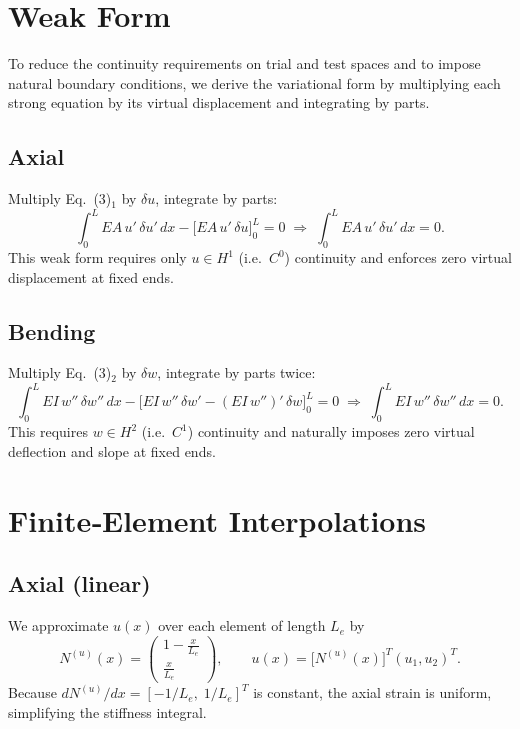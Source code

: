 \documentclass[preprint,12pt]{elsarticle}
\begin{document}
	\section{Weak Form}
	To reduce the continuity requirements on trial and test spaces and to impose natural boundary conditions, we derive the variational form by multiplying each strong equation by its virtual displacement and integrating by parts.
	
	\subsection{Axial}
	Multiply Eq.~(3)$_1$ by \(\delta u\), integrate by parts:
	\[
	\int_0^L EA\,u'\,\delta u'\,dx - \bigl[EA\,u'\,\delta u\bigr]_0^L = 0
	\;\Longrightarrow\;
	\int_0^L EA\,u'\,\delta u'\,dx = 0.
	\tag{2}
	\]
	This weak form requires only \(u\in H^1\) (i.e.\ \(C^0\)) continuity and enforces zero virtual displacement at fixed ends.
	
	\subsection{Bending}
	Multiply Eq.~(3)$_2$ by \(\delta w\), integrate by parts twice:
	\[
	\int_0^L EI\,w''\,\delta w''\,dx - \bigl[EI\,w''\,\delta w' - (EI\,w'')'\,\delta w\bigr]_0^L = 0
	\;\Longrightarrow\;
	\int_0^L EI\,w''\,\delta w''\,dx = 0.
	\tag{3}
	\]
	This requires \(w\in H^2\) (i.e.\ \(C^1\)) continuity and naturally imposes zero virtual deflection and slope at fixed ends.
	
	\section{Finite‐Element Interpolations}
	\subsection{Axial (linear)}
	We approximate \(u(x)\) over each element of length \(L_e\) by
	\[
	N^{(u)}(x)
	= \begin{pmatrix}1-\tfrac{x}{L_e}\\[4pt]\tfrac{x}{L_e}\end{pmatrix},
	\qquad
	u(x)=\bigl[N^{(u)}(x)\bigr]^T(u_1,u_2)^T.
	\tag{4}
	\]
	Because \(dN^{(u)}/dx=[-1/L_e,\;1/L_e]^T\) is constant, the axial strain is uniform, simplifying the stiffness integral.
	
\end{document}
